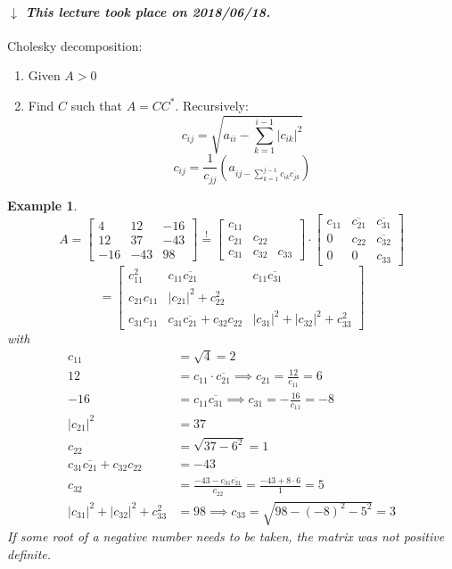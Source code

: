 \documentclass{article}
\newcounter{lecref}[section]
\numberwithin{lecref}{section}
\newtheorem{example}[lecref]{Example}
\newcommand{\card}[1]{\left|#1\right|}
\newcommand{\dateref}[1]{%
  \begin{mdframed}[backgroundcolor=gray!10,innerbottommargin=0pt,innertopmargin=0pt]
    \paragraph{\textit{$\downarrow$ This lecture took place on #1.}}%
  \end{mdframed}%
}
\begin{document}
\dateref{2018/06/18}

Cholesky decomposition:
\begin{enumerate}
  \item Given $A > 0$
  \item Find $C$ such that $A = CC^*$. Recursively:
    \[ c_{ij} = \sqrt{a_{ii} - \sum_{k=1}^{i-1} \card{c_{ik}}^2} \]
    \[ c_{ij} = \frac{1}{c_{jj}} (a_{ij - \sum_{k=1}^{j-1} c_{ik} \overline{c_{jk}}}) \]
\end{enumerate}

\begin{example} %
  \[
    A = \begin{bmatrix} 4 & 12 & -16 \\ 12 & 37 & -43 \\ -16 & -43 & 98 \end{bmatrix}
    \overset!= \begin{bmatrix} c_{11} & & \\ c_{21} & c_{22} & \\ c_{31} & c_{32} & c_{33} \end{bmatrix} \cdot \begin{bmatrix} c_{11} & \overline{c_{21}} & \overline{c_{31}} \\ 0 & c_{22} & \overline{c_{32}} \\ 0 & 0 & c_{33} \end{bmatrix}
  \] \[
    = \begin{bmatrix} c_{11}^2 & c_{11} \overline{c_{21}} & c_{11} \overline{c_{31}} \\
    c_{21} c_{11} & \card{c_{21}}^2 + c_{22}^2 & \\
    c_{31} c_{11} & c_{31} \overline{c_{21}} + c_{32} c_{22} & \card{c_{31}}^2 + \card{c_{32}}^2 + c_{33}^2 \end{bmatrix}
  \]
  with
  \begin{align*}
    c_{11} &= \sqrt4 = 2 \\
    12 &= c_{11} \cdot \overline{c_{21}} \implies c_{21} = \frac{12}{c_{11}} = 6 \\
    -16 &= c_{11} \overline{c_{31}} \implies c_{31} = -\frac{16}{c_{11}} = -8 \\
    \card{c_{21}}^2 &= 37 \\
    c_{22} &= \sqrt{37 - 6^2} = 1 \\
    c_{31} \overline{c_{21}} + c_{32} c_{22} &= -43 \\
    c_{32} &= \frac{-43 - c_{31} \overline{c_21}}{c_{22}} = \frac{-43 + 8 \cdot 6}{1} = 5 \\
    \card{c_{31}}^2 + \card{c_{32}}^2 + c_{33}^2 &= 98 \implies c_{33} = \sqrt{98 - (-8)^2 - 5^2} = 3
  \end{align*}
  If some root of a negative number needs to be taken, the matrix was not positive definite.
\end{example}
\end{document}
